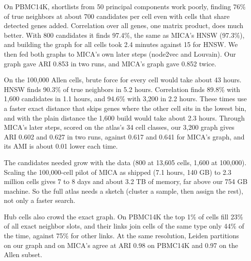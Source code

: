 On PBMC14K, shortlists from 50 principal components work poorly, finding 76\% of true neighbors at about 700 candidates per cell even with cells that share detected genes added. Correlation over all genes, one matrix product, does much better. With 800 candidates it finds 97.4\%, the same as MICA's HNSW (97.3\%), and building the graph for all cells took 2.4 minutes against 15 for HNSW. We then fed both graphs to MICA's own later steps (node2vec and Louvain). Our graph gave ARI 0.853 in two runs, and MICA's graph gave 0.852 twice.

On the 100,000 Allen cells, brute force for every cell would take about 43 hours. HNSW finds 90.3\% of true neighbors in 5.2 hours. Correlation finds 89.8\% with 1,600 candidates in 1.1 hours, and 94.6\% with 3,200 in 2.2 hours. These times use a faster exact distance that skips genes where the other cell sits in the lowest bin, and with the plain distance the 1,600 build would take about 2.3 hours. Through MICA's later steps, scored on the atlas's 34 cell classes, our 3,200 graph gives ARI 0.602 and 0.627 in two runs, against 0.617 and 0.641 for MICA's graph, and its AMI is about 0.01 lower each time.

The candidates needed grow with the data (800 at 13,605 cells, 1,600 at 100,000). Scaling the 100,000-cell pilot of MICA as shipped (7.1 hours, 140 GB) to 2.3 million cells gives 7 to 8 days and about 3.2 TB of memory, far above our 754 GB machine. So the full atlas needs a sketch (cluster a sample, then assign the rest), not only a faster search.

Hub cells also crowd the exact graph. On PBMC14K the top 1\% of cells fill 23\% of all exact neighbor slots, and their links join cells of the same type only 44\% of the time, against 75\% for other links. At the same resolution, Leiden partitions on our graph and on MICA's agree at ARI 0.98 on PBMC14K and 0.97 on the Allen subset.
